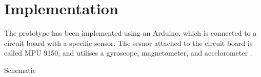 \chapter{Implementation}

The prototype has been implemented using an Arduino, which is connected to a circuit board with a specific sensor. 
The sesnor attached to the circuit board is called MPU 9150, and utilises a gyroscope, magnetometer, and accelorometer \citep{MPU}.

Schematic 

\begin{minipage}{\linewidth}%
\label{schematic}
\end{minipage}\\